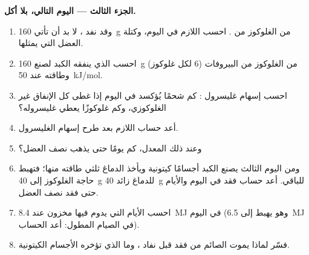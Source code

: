 \begin{problem}
\medskip
\noindent\textbf{الجزء الثالث --- اليوم التالي، بلا أكل.}
\begin{enumerate}[resume]
  \item وقد نفد ، لا بد أن تأتي \qty{160}{g} من الغلوكوز من
        . احسب  اللازم في اليوم، وكتلة العضل التي
        يمثلها.
  \item احسب  الذي ينفقه الكبد لصنع \qty{160}{g} من الغلوكوز من
        البيروفات (6  لكل غلوكوز) وطاقته عند \qty{50}{kJ/mol}.
  \item احسب إسهام غليسرول : كم شحمًا يُؤكسد في اليوم إذا غطى كل
        الإنفاق غير الغلوكوزي، وكم غلوكوزًا يعطي غليسروله؟
  \item أعد حساب  اللازم بعد طرح إسهام الغليسرول.
  \item وعند ذلك المعدل، كم يومًا حتى يذهب نصف العضل؟
  \item ومن اليوم الثالث يصنع الكبد أجسامًا كيتونية ويأخذ الدماغ
        ثلثي طاقته منها؛ فتهبط حاجة الغلوكوز إلى \qty{40}{g} للدماغ
        زائد \qty{40}{g} للباقي. أعد حساب فقد  في اليوم
        والأيام حتى فقد نصف العضل.
  \item احسب الأيام التي يدوم فيها مخزون  عند \qty{8.4}{MJ} في
        اليوم (وهو يهبط إلى \qty{6.5}{MJ} في الصيام المطول: أعد
        الحساب).
  \item فسّر لماذا يموت الصائم من فقد  قبل نفاد ، وما
        الذي تؤخره الأجسام الكيتونية.
\end{enumerate}


\end{problem}
